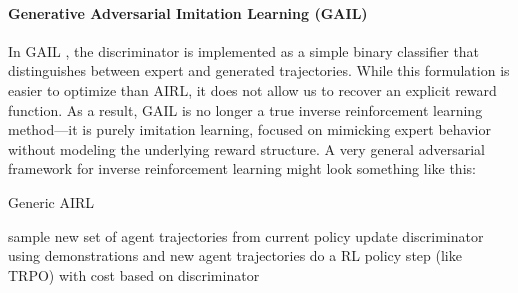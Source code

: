 \paragraph{Generative Adversarial Imitation Learning (GAIL)}
In GAIL \cite{ho2016generativeadversarialimitationlearning}, the discriminator is implemented as a simple binary 
classifier that distinguishes between expert and generated trajectories. While 
this formulation is easier to optimize than AIRL, it does not allow us to recover an explicit reward function. As a 
result, GAIL is no longer 
a true inverse reinforcement learning method—it is purely imitation learning, focused on mimicking expert behavior without modeling the 
underlying reward structure.
\newline \newline
A very general adversarial framework for inverse reinforcement learning might look something like this:
\begin{algorithm}[H]
  \large
    \caption{Generic AIRL}\label{AIRL}%
    \begin{algorithmic}
        \STATE sample new set of agent trajectories from current policy
        \STATE update discriminator using demonstrations and new agent trajectories
        \STATE do a RL policy step (like TRPO) with cost based on discriminator
        \ENDFOR
    \end{algorithmic}
\end{algorithm}

